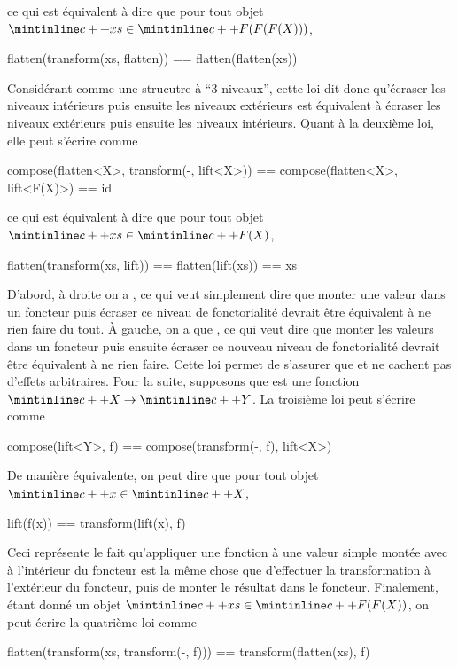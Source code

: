 ce qui est équivalent à dire que pour tout objet $\cc{xs} \in \cc{F(F(F(X)))}$,
\begin{cpp}
    flatten(transform(xs, flatten)) == flatten(flatten(xs))
\end{cpp}

Considérant  comme une strucutre à ``3 niveaux'', cette loi dit donc
qu'écraser les niveaux intérieurs puis ensuite les niveaux extérieurs est
équivalent à écraser les niveaux extérieurs puis ensuite les niveaux
intérieurs. Quant à la deuxième loi, elle peut s'écrire comme
\begin{cpp}
    compose(flatten<X>, transform(-, lift<X>))
        == compose(flatten<X>, lift<F(X)>)
        == id
\end{cpp}

ce qui est équivalent à dire que pour tout objet $\cc{xs} \in \cc{F(X)}$,
\begin{cpp}
    flatten(transform(xs, lift)) == flatten(lift(xs)) == xs
\end{cpp}

D'abord, à droite on a , ce qui veut simplement
dire que monter une valeur dans un foncteur puis écraser ce niveau de
fonctorialité devrait être équivalent à ne rien faire du tout. À gauche, on
a que , ce qui veut dire que monter
les valeurs dans un foncteur puis ensuite écraser ce nouveau niveau de
fonctorialité devrait être équivalent à ne rien faire. Cette loi permet
de s'assurer que  et  ne cachent pas d'effets arbitraires.
Pour la suite, supposons que  est une fonction $\cc{X} \to \cc{Y}$. La
troisième loi peut s'écrire comme
\begin{cpp}
    compose(lift<Y>, f) == compose(transform(-, f), lift<X>)
\end{cpp}

De manière équivalente, on peut dire que pour tout objet $\cc{x} \in \cc{X}$,
\begin{cpp}
    lift(f(x)) == transform(lift(x), f)
\end{cpp}

Ceci représente le fait qu'appliquer une fonction à une valeur simple montée
avec  à l'intérieur du foncteur est la même chose que d'effectuer
la transformation à l'extérieur du foncteur, puis de monter le résultat dans
le foncteur. Finalement, étant donné un objet $\cc{xs} \in \cc{F(F(X))}$, on
peut écrire la quatrième loi comme
\begin{cpp}
    flatten(transform(xs, transform(-, f))) == transform(flatten(xs), f)
\end{cpp}

